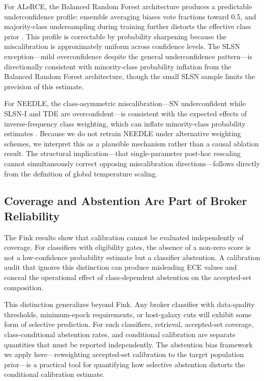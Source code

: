 \documentclass[twocolumn]{aastex631}
\begin{document}
For ALeRCE, the Balanced Random Forest architecture produces a
predictable underconfidence profile: ensemble averaging biases
vote fractions toward 0.5, and majority-class undersampling during
training further distorts the effective class prior
\citep{vandengoorbergh2022}. This profile is correctable by
probability sharpening because the miscalibration is approximately
uniform across confidence levels. The SLSN exception---mild
overconfidence despite the general underconfidence pattern---is
directionally consistent with minority-class probability inflation
from the Balanced Random Forest architecture, though the small
SLSN sample limits the precision of this estimate.

For NEEDLE, the class-asymmetric miscalibration---SN underconfident
while SLSN-I and TDE are overconfident---is consistent with the
expected effects of inverse-frequency class weighting, which can
inflate minority-class probability estimates
\citep{vandengoorbergh2022}. Because we do not retrain NEEDLE
under alternative weighting schemes, we interpret this as a
plausible mechanism rather than a causal ablation result. The
structural implication---that single-parameter post-hoc rescaling
cannot simultaneously correct opposing miscalibration
directions---follows directly from the definition of global
temperature scaling.

\subsection{Coverage and Abstention Are Part of Broker
Reliability}\label{sec:disc_coverage}

The Fink results show that calibration cannot be evaluated
independently of coverage. For classifiers with eligibility gates,
the absence of a non-zero score is not a low-confidence probability
estimate but a classifier abstention. A calibration audit that
ignores this distinction can produce misleading ECE values and
conceal the operational effect of class-dependent abstention on
the accepted-set composition.

This distinction generalizes beyond Fink. Any broker classifier
with data-quality thresholds, minimum-epoch requirements, or
host-galaxy cuts will exhibit some form of selective prediction.
For such classifiers, retrieval, accepted-set coverage,
class-conditional abstention rates, and conditional calibration
are separate quantities that must be reported independently.
The abstention bias framework we apply here---reweighting
accepted-set calibration to the target population prior---is a
practical tool for quantifying how selective abstention distorts
the conditional calibration estimate.
\end{document}
